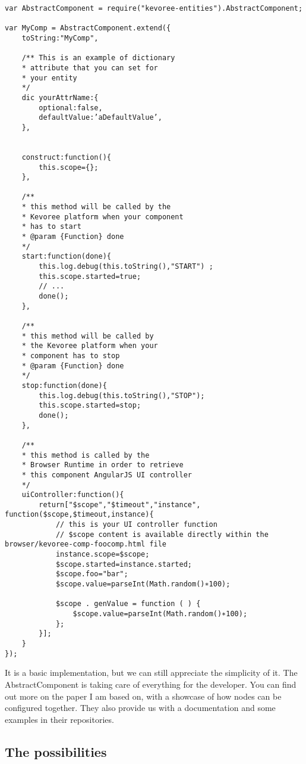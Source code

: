 \documentclass{aes2e}
\begin{document}
\begin{lstlisting}
var AbstractComponent = require("kevoree-entities").AbstractComponent;

var MyComp = AbstractComponent.extend({
	toString:"MyComp",

	/** This is an example of dictionary 
    * attribute that you can set for 
    * your entity 
    */
	dic yourAttrName:{
		optional:false,
		defaultValue:’aDefaultValue’,
	},
    
    
    construct:function(){
		this.scope={};
	},
    
    /**
	* this method will be called by the 
    * Kevoree platform when your component 
    * has to start
	* @param {Function} done
	*/
	start:function(done){
		this.log.debug(this.toString(),"START") ;
		this.scope.started=true;
		// ...
		done();
	},
    
    /**
	* this method will be called by 
    * the Kevoree platform when your 
    * component has to stop
	* @param {Function} done
	*/
	stop:function(done){
		this.log.debug(this.toString(),"STOP");
		this.scope.started=stop;
		done();
    },
    
    /**
	* this method is called by the 
    * Browser Runtime in order to retrieve
	* this component AngularJS UI controller
	*/
	uiController:function(){
    	return["$scope","$timeout","instance", function($scope,$timeout,instance){
			// this is your UI controller function
			// $scope content is available directly within the browser/kevoree-comp-foocomp.html file
			instance.scope=$scope;
			$scope.started=instance.started;
			$scope.foo="bar";
			$scope.value=parseInt(Math.random()∗100);
            
            $scope . genValue = function ( ) {
				$scope.value=parseInt(Math.random()∗100);
            };
        }];
    }
}); 
\end{lstlisting}

It is a basic implementation, but we can still appreciate the simplicity of it. The AbstractComponent is taking care of everything for the developer. You can find out more on the paper I am based on, with a showcase of how nodes can be configured together\cite{DEK1}. They also provide us with a documentation\cite{DEK4} and some examples in their repositories\cite{DEK5}.

\subsection{The possibilities}
\end{document}
